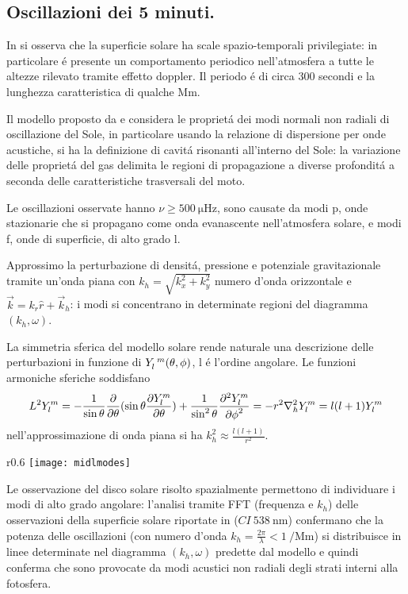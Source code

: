 \documentclass[../main.tex]{subfiles}
\begin{document}
\subsection{Oscillazioni dei 5 minuti.}

In \citet{lei62velocity} si osserva che la superficie solare ha scale spazio-temporali privilegiate: in particolare \'e presente un comportamento periodico nell'atmosfera a tutte le altezze rilevato tramite effetto doppler. Il periodo \'e di circa 300 secondi e la lunghezza caratteristica di qualche \si{\mega\meter}.

Il modello proposto da \citet{ulrich70five} e \citet*{stein71five} considera le propriet\'a dei modi normali non radiali di oscillazione del Sole, in particolare usando la relazione di dispersione per onde acustiche, si ha la definizione di cavit\'a risonanti all'interno del Sole: la variazione delle propriet\'a del gas delimita le regioni di propagazione a diverse profondit\'a a seconda delle caratteristiche trasversali del moto.

Le oscillazioni osservate hanno $\nu\geq\SI{500}{\micro\hertz}$, sono causate da modi p, onde stazionarie che si propagano come onda evanascente nell'atmosfera solare, e modi f, onde di superficie, di alto grado l.

Approssimo la perturbazione di densit\'a, pressione e potenziale gravitazionale tramite un'onda piana con $k_h=\sqrt{k_x^2+k_y^2}$ numero d'onda orizzontale e $\vec{k}=k_r\hat{r}+\vec{k}_h$:  i modi si concentrano in determinate regioni del diagramma  $(k_h,\omega)$.

La simmetria sferica del modello solare rende naturale una descrizione delle perturbazioni in funzione di $Y\indices{_l^m}(\theta,\phi)$, l \'e l'ordine angolare. Le funzioni armoniche sferiche  soddisfano
\begin{equation}
L^2Y_l^m=-\frac{1}{\sin{\theta}}\frac{\partial}{\partial \theta}(\sin{\theta}\frac{\partial Y_l^m}{\partial \theta})+\frac{1}{\sin^2{\theta}}\frac{\partial^2 Y_l^m}{{\partial \phi}^2}=-r^2\nabla_h^2Y_l^m=l(l+1)Y_l^m\label{eq:SHperturb}
\end{equation}
nell'approssimazione di onda piana si ha $k_h^2\approx\frac{l(l+1)}{r^2}$.

\begin{minipage}[c][7cm][c]{\textwidth}
\begin{wrapfigure}[12]{r}{0.6\textwidth}
\centering
\texttt{[image: midlmodes]}
\caption{Distribuzione dei modi con $l\leq300$ nel diagramma $\nu-l$. Da \cite{chr02helioseismology}.}\label{fig:midlmodes}
\end{wrapfigure}
Le osservazione del disco solare risolto spazialmente permettono di individuare i modi di alto grado angolare: l'analisi tramite FFT (frequenza e $k_h$) delle osservazioni della superficie solare riportate in \citet{deu75observations} ($CI\ \SI{538}{\nano\meter}$) confermano che la  potenza delle oscillazioni (con numero d'onda $k_h=\frac{2\pi}{\lambda}<\SI{1}{\per\mega\meter}$) si distribuisce in linee determinate nel diagramma $(k_h,\omega)$ predette dal modello e quindi conferma che sono provocate da modi acustici non radiali degli strati interni alla fotosfera.
\end{minipage}
\end{document}
